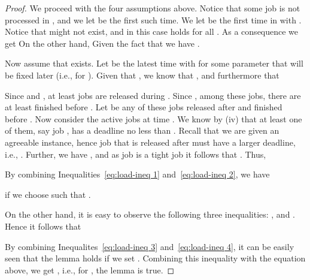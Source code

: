 \documentclass[letterpaper,11pt]{article}
\begin{document}
\begin{proof}
We proceed with the four assumptions above. Notice that some job is not processed in , and we let  be the first such time. We let  be the first time in  with . Notice that  might not exist, and in this case  holds for all . As a consequence we get  On the other hand,  Given the fact that  we have .

Now assume that  exists. Let  be the latest time with  for some parameter  that will be fixed later (i.e.,  for ). Given that , we know that , and furthermore that


Since  and , at least  jobs are released during . Since , among these  jobs, there are at least  finished before . Let  be any of these jobs released after  and finished before . Now consider the active jobs at time . We know by (iv) that at least one of them, say job , has a deadline no less than . Recall that we are given an agreeable instance, hence job  that is released after  must have a larger deadline, i.e., . Further, we have , and as job  is a tight job it follows that . Thus,


By combining Inequalities~\ref{eq:load-ineq 1} and~\ref{eq:load-ineq 2}, we have

if we choose  such that .

On the other hand, it is easy to observe the following three inequalities: ,  and
. Hence it follows that
 
By combining Inequalites~\ref{eq:load-ineq 3} and~\ref{eq:load-ineq 4}, it can be easily seen that the lemma holds if we set
.
Combining this inequality with the equation  above, we get , i.e., for , the lemma is true.
\end{proof}
\end{document}
